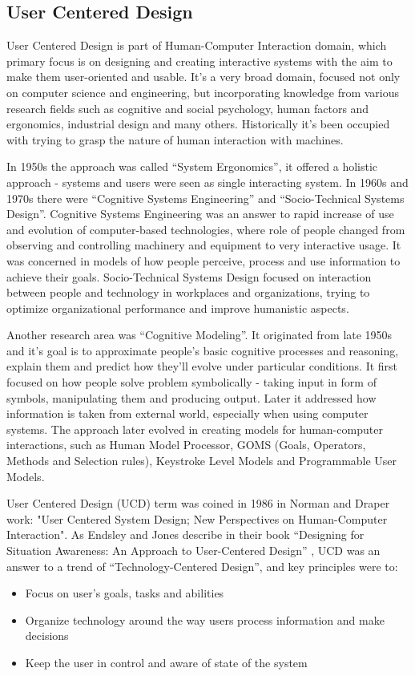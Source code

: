 \documentclass{article}
\begin{document}
\subsection{User Centered Design}
User Centered Design is part of Human-Computer Interaction domain, which primary focus is on designing and  creating interactive systems with the aim to make them user-oriented and usable. It's a very broad domain, focused not only on computer science and engineering, but incorporating knowledge from various research fields such as cognitive and social psychology, human factors and ergonomics, industrial design and many others. Historically it's been occupied with trying to grasp the nature of human interaction with machines. \cite{ritter2014user}

In 1950s the approach was called ``System Ergonomics'', it offered a holistic approach - systems and users were seen as single interacting system. In 1960s and 1970s there were ``Cognitive Systems Engineering'' and ``Socio-Technical Systems Design''. Cognitive Systems Engineering was an answer to rapid increase of use and evolution of computer-based technologies, where role of people changed from observing and controlling machinery and equipment to very interactive usage. It was concerned in models of how people perceive, process and use information to achieve their goals. Socio-Technical Systems Design focused on interaction between people and technology in workplaces and organizations, trying to optimize organizational performance and improve humanistic aspects.

Another research area was ``Cognitive Modeling''. It originated from late 1950s and it's goal is to approximate people's basic cognitive processes and reasoning, explain them and predict how they'll evolve under particular conditions. It first focused on how people solve problem symbolically - taking input in form of symbols, manipulating them and producing output. Later it addressed how information is taken from external world, especially when using computer systems. The approach later evolved in creating models for human-computer interactions, such as Human Model Processor, GOMS (Goals, Operators, Methods and Selection rules), Keystroke Level Models and Programmable User Models.

User Centered Design (UCD) term was coined in 1986 in Norman and Draper work: "User Centered System Design; New Perspectives on Human-Computer Interaction". As Endsley and Jones describe in their book ``Designing for Situation Awareness: An Approach to User-Centered Design'' \cite{endsley2016designing}, UCD was an answer to a trend of ``Technology-Centered Design'', and key principles were to:
\begin{itemize}
    \item Focus on user's goals, tasks and abilities
    \item Organize technology around the way users process information and make decisions
    \item Keep the user in control and aware of state of the system
\end{itemize}
\end{document}
